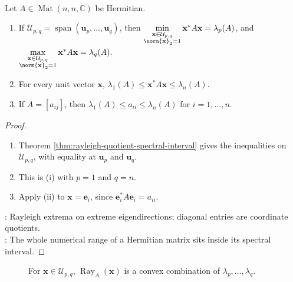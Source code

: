 \begin{corollary} \label{cor:rayleigh-extrema-and-diagonal-entry-bounds} \\
Let $A\in\operatorname{Mat}(n,n,\mathbb{C})$ be Hermitian.
\begin{enumerate}[label=(\roman*)]
\setlength{\itemsep}{0pt}
\item If $\mathcal{U}_{p,q}=\operatorname{span}(\mathbf{u}_p,\ldots,\mathbf{u}_q)$, then $\min\limits_{\substack{\mathbf{x}\in\mathcal{U}_{p,q}\\ \norm{\mathbf{x}}_2=1}}\mathbf{x}^*A\mathbf{x}=\lambda_p(A)$, and $\max\limits_{\substack{\mathbf{x}\in\mathcal{U}_{p,q}\\ \norm{\mathbf{x}}_2=1}}\mathbf{x}^*A\mathbf{x}=\lambda_q(A).$
\item For every unit vector $\mathbf{x}$, $\lambda_1(A)\leq \mathbf{x}^*A\mathbf{x}\leq\lambda_n(A)$.
\item If $A=[a_{ij}]$, then $\lambda_1(A)\leq a_{ii}\leq\lambda_n(A)$ for $i=1,\ldots,n$.
\end{enumerate}
\begin{proof}
\begin{enumerate}[label=(\roman*)]
\setlength{\itemsep}{0pt}
\item Theorem \ref{thm:rayleigh-quotient-spectral-interval} gives the inequalities on $\mathcal{U}_{p,q}$, with equality at $\mathbf{u}_p$ and $\mathbf{u}_q$.
\item This is (i) with $p=1$ and $q=n$.
\item Apply (ii) to $\mathbf{x}=\mathbf{e}_i$, since $\mathbf{e}_i^*A\mathbf{e}_i=a_{ii}$.
\end{enumerate}
: Rayleigh extrema on extreme eigendirections; diagonal entries are coordinate quotients.\\
: The whole numerical range of a Hermitian matrix sits inside its spectral interval.
\end{proof}
\end{corollary}

\begin{figure}[H]
  \centering
  
  \caption{For $\mathbf{x}\in\mathcal{U}_{p,q}$, $\operatorname{Ray}_A(\mathbf{x})$ is a convex combination of $\lambda_p,\ldots,\lambda_q$.}
  \label{fig:rayleigh-quotient-convex-combination}
\end{figure}

